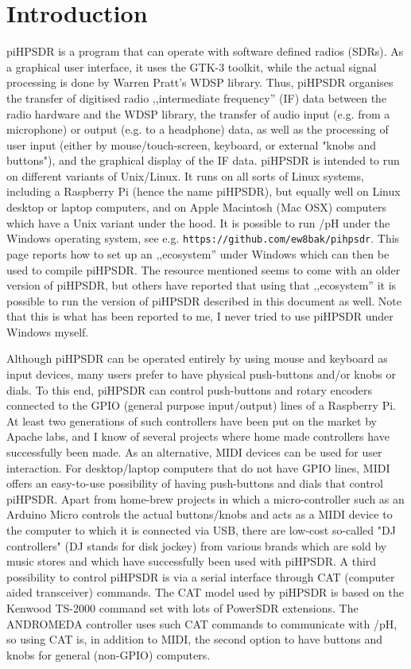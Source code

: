 \documentclass[12pt]{book}
\def\pH{pi\-HPSDR\xspace}
\begin{document}
\chapter{Introduction}
\pH is a program that can operate with software defined radios (SDRs). As a graphical user interface,
it uses the GTK-3 toolkit, while the actual signal processing is done by Warren Pratt's WDSP library. Thus,
\pH organises the transfer of digitised radio ,,intermediate frequency'' (IF)
data between the radio hardware and the
WDSP library, the
transfer of audio input (e.g. from a microphone) or output (e.g. to a headphone) data,
 as well as the processing of user
input (either by mouse/touch-screen, keyboard, or external "knobs and buttons"),
 and the graphical display of the IF data. \pH is intended
to run on different variants of Unix/Linux. It runs on all sorts of Linux systems,
including a Raspberry Pi (hence
the name \pH), but equally well on Linux desktop or laptop computers, and on Apple Macintosh (Mac OSX)
computers which have a Unix variant under the hood.
It is possible to run
/pH under the Windows operating system, see e.g. \texttt{https://github.com/ew8bak/pihpsdr}.
This page reports how to set up an ,,ecosystem'' under Windows which can then be used to compile
\pH. The resource mentioned seems to come with an older version of \pH, but others have reported
that using that ,,ecosystem'' it is possible to run the version of \pH described in this document
as well. Note that this is what has been reported to me, I never tried to use \pH under Windows
myself.


Although \pH can be operated entirely by using mouse and keyboard as input devices, many users prefer to
have physical push-buttons and/or knobs or dials. To this end, \pH can control push-buttons and rotary
encoders connected to the GPIO (general purpose input/output)
lines of a Raspberry Pi. At least two generations of such controllers have
been put on the market by Apache labs, and I know of several projects where home made controllers have
successfully been made. As an alternative, MIDI devices can be used for user interaction. For desktop/laptop
computers that do not have GPIO lines, MIDI offers an easy-to-use possibility of having push-buttons and
dials that control \pH. Apart from home-brew projects in which a micro-controller such as an Arduino
Micro controls the actual buttons/knobs and acts as a MIDI device to the computer to which it is connected
via USB, there are low-cost so-called "DJ controllers" (DJ stands for disk jockey) from various brands
which are sold by music stores and
which
have successfully been used with \pH. A third possibility to control \pH is via a serial interface
through CAT (computer aided transceiver) commands. The CAT model used by \pH is based on the Kenwood
TS-2000 command set with lots of PowerSDR extensions. The ANDROMEDA controller uses such CAT commands to
communicate with /pH, so using CAT is, in addition to MIDI, the second option to have buttons and knobs
for general (non-GPIO) computers.
\end{document}
